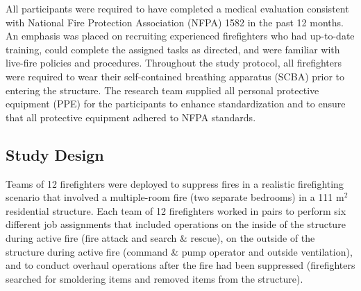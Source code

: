 \documentclass[12pt,oneside]{article}
\begin{document}
All participants were required to have completed a medical evaluation consistent with National Fire Protection Association (NFPA) 1582 \cite{NFPA_1582} in the past 12 months. An emphasis was placed on recruiting  experienced firefighters who had up-to-date training, could complete the assigned tasks as directed, and were familiar with live-fire policies and procedures. Throughout the study protocol, all firefighters were required to wear their self-contained breathing apparatus (SCBA) prior to entering the structure. The research team supplied all personal protective equipment (PPE) for the participants to enhance standardization and to ensure that all protective equipment adhered to NFPA standards.

\subsection{Study Design}
\label{subsec:design}


Teams of 12 firefighters were deployed to suppress fires in a realistic firefighting scenario that involved a multiple-room fire (two separate bedrooms) in a 111 m$^2$ residential structure. Each team of 12 firefighters worked in pairs to perform six different job assignments that included operations on the inside of the structure during active fire (fire attack and search \& rescue), on the outside of the structure during active fire (command \& pump operator and outside ventilation), and to conduct overhaul operations after the fire had been suppressed (firefighters searched for smoldering items and removed items from the structure).  
\end{document}
